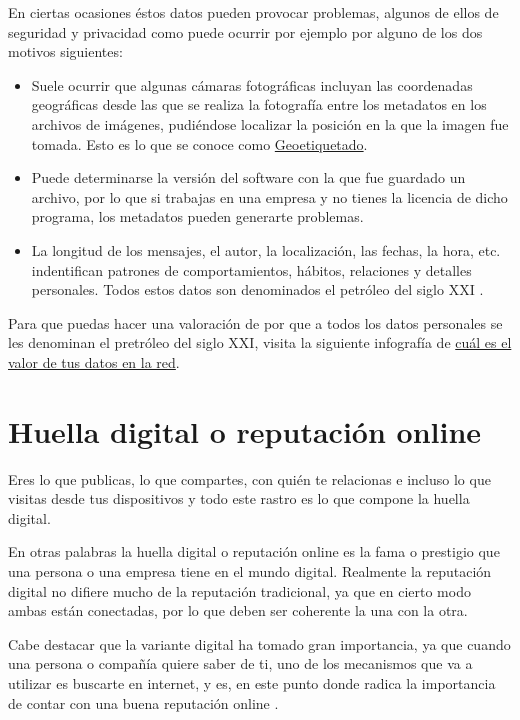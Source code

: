 \documentclass[
  spanish,
  a4paper,
  openany]{book}
\begin{document}
En ciertas ocasiones éstos datos pueden provocar problemas, algunos de ellos de seguridad y privacidad como puede ocurrir por ejemplo por alguno de los dos motivos siguientes:

\begin{itemize}
\item
  Suele ocurrir que algunas cámaras fotográficas incluyan las coordenadas geográficas desde las que se realiza la fotografía entre los metadatos en los archivos de imágenes, pudiéndose localizar la posición en la que la imagen fue tomada. Esto es lo que se conoce como \href{https://es.wikipedia.org/wiki/Geoetiquetado}{Geoetiquetado}.
\item
  Puede determinarse la versión del software con la que fue guardado un archivo, por lo que si trabajas en una empresa y no tienes la licencia de dicho programa, los metadatos pueden generarte problemas.
\item
  La longitud de los mensajes, el autor, la localización, las fechas, la hora, etc. indentifican patrones de comportamientos, hábitos, relaciones y detalles personales. Todos estos datos son denominados el petróleo del siglo XXI \citep{OSI-petroleo-S-XXI}.
\end{itemize}

Para que puedas hacer una valoración de por que a todos los datos personales se les denominan el pretróleo del siglo XXI, visita la siguiente infografía de \href{https://www.osi.es/sites/default/files/images/concienciacion/c15-pdf-infografia-ciberdelincuentes_reyes.pdf}{cuál es el valor de tus datos en la red}.

\hypertarget{huella-digital-o-reputaciuxf3n-online}{%
\section{Huella digital o reputación online}\label{huella-digital-o-reputaciuxf3n-online}}

Eres lo que publicas, lo que compartes, con quién te relacionas e incluso lo que visitas desde tus dispositivos y todo este rastro es lo que compone la huella digital.

En otras palabras la huella digital o reputación online es la fama o prestigio que una persona o una empresa tiene en el mundo digital. Realmente la reputación digital no difiere mucho de la reputación tradicional, ya que en cierto modo ambas están conectadas, por lo que deben ser coherente la una con la otra.

Cabe destacar que la variante digital ha tomado gran importancia, ya que cuando una persona o compañía quiere saber de ti, uno de los mecanismos que va a utilizar es buscarte en internet, y es, en este punto donde radica la importancia de contar con una buena reputación online \citep{huella-digital}.
\end{document}
